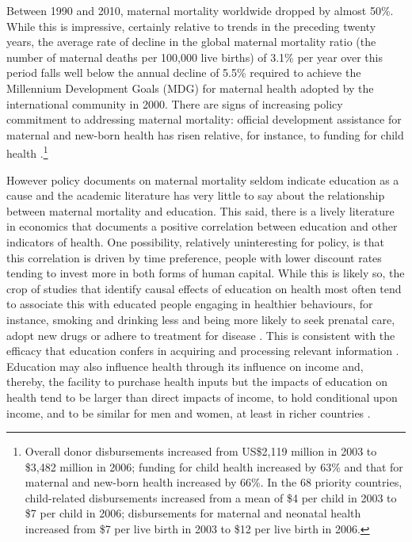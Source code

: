 \documentclass{article}[12pt,subeqn]
\begin{document}
\begin{spacing}{1.4}
Between 1990 and 2010, maternal mortality worldwide dropped by almost 50\%. While this is impressive,
certainly relative to trends in the preceding twenty years, the average rate of decline in the global maternal
mortality ratio (the number of maternal deaths per 100,000 live births) of 3.1\% per year over this period falls
well below the annual decline of 5.5\% required to achieve the Millennium Development Goals (MDG) for
maternal health adopted by the international community in 2000. There are signs of increasing policy
commitment to addressing maternal mortality: official development assistance for maternal and new-born
health has risen relative, for instance, to funding for child health \citep{Grecoetal2008}.\footnote{Overall 
donor disbursements increased from US\$2,119 million in 2003 to \$3,482 million in 2006; funding for child
health increased by 63\% and that for maternal and new-born health increased by 66\%. In the 68 priority countries,
child-related disbursements increased from a mean of \$4 per child in 2003 to \$7 per child in 2006; disbursements for
maternal and neonatal health increased from \$7 per live birth in 2003 to \$12 per live birth in 2006.}

However policy documents on maternal mortality seldom indicate education as a cause and the academic
literature has very little to say about the relationship between maternal mortality and education. This said,
there is a lively literature in economics that documents a positive correlation between education and other
indicators of health. One possibility, relatively uninteresting for policy, is that this correlation is driven by
time preference, people with lower discount rates tending to invest more in both forms of human capital.
While this is likely so, the crop of studies that identify causal effects of education on health most often tend
to associate this with educated people engaging in healthier behaviours, for instance, smoking and drinking
less and being more likely to seek prenatal care, adopt new drugs or adhere to treatment for disease
\citep{GoldmanSmith2010, GoldmanLakdawalla2001, CurrieMoretti2003, LichtenburgLlerasMuney2005, CutlerLlerasMuney2010,
GliedLlerasMuney2010, JensenLlerasMuney2012}. This is consistent with the efficacy that education confers 
in acquiring and processing relevant information \citep{Rosenzweig1995, RosenzweigSchultz1989, CutlerLlerasMuney2010}.
Education may also influence health through its influence on income and, thereby, the facility to purchase
health inputs but the impacts of education on health tend to be larger than direct impacts of income, to hold
conditional upon income, and to be similar for men and women, at least in richer countries \citep{LlerasMuney2005, 
CutlerLlerasMuney2010}.


\end{spacing}
\end{document}
